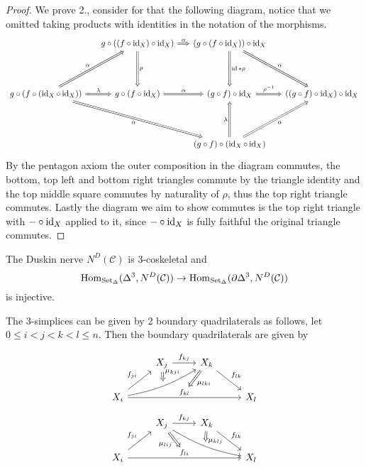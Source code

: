 \begin{proof}
	We prove 2., consider for that the following diagram, notice that we omitted taking products with identities in the notation of the morphisms. 
	\[
	\begin{tikzcd}[row sep= 1.5cm, column sep= 0.5cm]
		&
		g \circ ( ( f \circ \id_X ) \circ \id_X ) 
		\ar[r, Rightarrow, "\alpha"]
		\ar[d, Rightarrow, "\rho"]
		&
		( g \circ ( f \circ \id_X ) ) \circ \id_X 
		\ar[d, Rightarrow, "\id * \rho"] 
		\ar[rd, Rightarrow, "\alpha"]
		\\
		g \circ ( f \circ ( \id_X \circ \id_X ) ) 
		\ar[r, Rightarrow, "\lambda"]
		\ar[rrd, Rightarrow, "\alpha"']
		\ar[ru, Rightarrow, "\alpha"]
		&
		g \circ ( f \circ \id_X )
		\ar[r, Rightarrow, "\alpha"] 
		&
		( g \circ f ) \circ \id_X 
		\ar[r, Rightarrow, " \rho^{ - 1 }"]
		&
		( ( g \circ f ) \circ \id_X ) \circ \id_X 
		\\
		& &
		( g \circ f ) \circ ( \id_X \circ \id_X )
		\ar[u, Rightarrow, "\lambda"]
		\ar[ru, Rightarrow, "\alpha"']
	\end{tikzcd}
	\]
	By the pentagon axiom the outer composition in the diagram commutes, the bottom, top left and bottom right triangles commute by the triangle identity and the top middle square commutes by naturality of $ \rho $, thus the top right triangle commutes.
	Lastly the diagram we aim to show commutes is the top right triangle with $ - \circ \operatorname{id}_X $ applied to it, since $ - \circ \operatorname{id}_X $ is fully faithful the original triangle commutes.
\end{proof}

\begin{cor}
	The Duskin nerve $ N^D ( \mathcal{ C } ) $ is 3-coskeletal and 
	\[
	 	\operatorname{Hom}_{ \operatorname{Set}_{\Delta} } ( \Delta^3 , N^D ( \mathcal{ C } ) ) \to \operatorname{Hom}_{ \operatorname{Set}_{\Delta} } ( \partial \Delta^3 , N^D ( \mathcal{ C } ) ) 
	\]
  	is injective.
\end{cor}

The 3-simplices can be given by 2 boundary quadrilaterals as follows, let $ 0 \leq i < j < k < l \leq n $.
Then the boundary quadrilaterals are given by

\[
\begin{tikzcd}
	&
	X_j
	\ar[r , " f_{ k j } " ]
	&
	X_k
	\ar[rd, "f_{ l k } "]
	\\
	X_i
	\ar[rru,bend right=10,""{name=U, above}]
	\ar[ru, " f_{ j i } " ]
	\ar[rrr, " f_{ k l } "' {name=R, above}]
	\arrow[Rightarrow, from=ru, to=U, "\mu_{ k j i } "]
	&&&
	X_l
	\ar[Rightarrow, from=ul, to=R, "\mu_{ l k i } "]
\end{tikzcd}
\]
\[
\begin{tikzcd}
	&
	X_j
	\ar[r , " f_{ k j } " ]
	\ar[rrd, bend right=10,""{name=D, above}]
	&
	X_k
	\ar[rd, "f_{ l k } "]
	\ar[Rightarrow, to=D, "\mu_{ k l j } "]
	\\
	X_i
	\ar[ru, " f_{ j i } " ]
	\ar[rrr, " f_{ l i } "' {name=L, above}]
	\ar[Rightarrow, from=ur, to=L, "\mu_{ l i j } "']
	&&&
	X_l
\end{tikzcd}
\]

